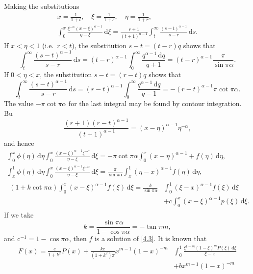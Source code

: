 \documentclass[leqno]{article}
\numberwithin{equation}{section}
\theoremstyle{plain}
\newcommand{\dd}{\,\mathrm{d}}
\begin{document}
Making the substitutions
\begin{gather*}
	x =\frac{1}{1+t}, \quad \xi = \frac{1}{1+s}, \quad \eta = \frac{1}{1+r}, \\
	\int_0^x \frac{\xi^{-\alpha}(x-\xi)^{\alpha-1}}{\eta-\xi} \dd \xi = \frac{r+1}{(t+1)^{\alpha-1}} \int_t^{\infty} \frac{(s-t)^{\alpha-1}}{s-r} \dd s.
\end{gather*}
If $x < \eta < 1$ (i.e.\ $r < t$), the substitution $s-t=(t-r)q$ shows that
\begin{equation*}
	\int_t^{\infty} \frac{(s-t)^{\alpha-1}}{s-r} \dd s
	= (t-r)^{\alpha-1} \int_0^\infty \frac{q^{\alpha-1}\dd q}{q+1} 
	= (t-r)^{\alpha-1} \frac{\pi}{\sin \pi \alpha}.
\end{equation*}
If $0 < \eta < x$, the substitution $s-t=(r-t)q$ shows that
\begin{equation*}
	\int_t^{\infty} \frac{(s-t)^{\alpha-1}}{s-r} \dd s
	= (r-t)^{\alpha-1} \int_0^\infty \frac{q^{\alpha-1}\dd q}{q-1} 
	= -(r-t)^{\alpha-1} \pi \cot \pi \alpha.
\end{equation*}
The value $-\pi\cot\pi\alpha$ for the last integral may be found by contour integration.
Bu
\begin{equation*}
	\frac{(r+1)(r-t)^{\alpha-1}}{(t+1)^{\alpha-1}}=(x-\eta)^{\alpha-1}\eta^{-\alpha},
\end{equation*}
and hence
\begin{gather*}
	\int_{0}^{x} \phi(\eta) \dd\eta \int_{0}^{x} \frac{(x-\xi)^{\alpha-1} \xi^{-\alpha}}{\eta-\xi} \dd\xi=-\pi \cot \pi \alpha \int_{0}^{x}(x-\eta)^{\alpha-1}+f(\eta) \dd\eta, \\
	\int_{x}^{1} \phi(\eta) \dd\eta \int_{0}^{x} \frac{(x-\xi)^{\alpha-1} \xi^{-\alpha}}{\eta-\xi} \dd\xi=\frac{\pi}{\sin \pi \alpha} \int_{x}^{1}(\eta-x)^{\alpha-1} f(\eta) \dd\eta, \\
	\begin{split}
		(1+k \cot \pi \alpha) \int_{0}^{x}(x-\xi)^{\alpha-1} f(\xi) \dd\xi=\frac{k}{\sin \pi \alpha} & \int_{0}^{1}(\xi-x)^{\alpha-1} f(\xi) \dd\xi
		\\ & +c \int_{0}^{x}(x-\xi)^{\alpha-1} p(\xi) \dd\xi.
	\end{split}
\end{gather*}
If we take
\begin{equation*}
	k=\frac{\sin \pi \alpha}{1-\cos \pi \alpha}=-\tan \pi m,
\end{equation*}
and $\mathrm{c}^{-1}=1-\cos \pi \alpha$, then $f$ is a solution of \eqref{4.3}.
It is known \cite[p.\ 130]{M} that
\begin{equation*}
	\begin{split}
		F(x)=\frac{c}{1+k^{2}} P(x)+\frac{k c}{\left(1+k^{2}\right) \pi} x^{m-1}(1-x)^{-m} &\int_{0}^{1} \frac{\xi^{1-m}(1-\xi)^{m} P(\xi) \dd\xi}{\xi-x} \\
		&+b x^{m-1}(1-x)^{-m}
	\end{split}
\end{equation*}
\end{document}
